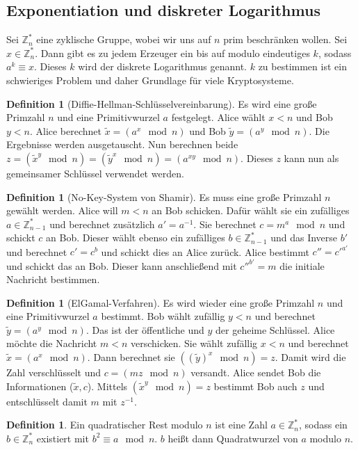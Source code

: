 \documentclass[a4paper, 12pt]{article}
\theoremstyle{plain}
\theoremstyle{definition}
\newtheorem{definition}[theorem]{Definition} %
\theoremstyle{lemma}
\theoremstyle{remark}
\theoremstyle{corollary}
\theoremstyle{example}
\begin{document}
	\subsection{Exponentiation und diskreter Logarithmus}
	Sei $\mathbb{Z}_n^*$ eine zyklische Gruppe, wobei wir uns auf $n$ prim beschränken wollen. Sei $x \in \mathbb{Z}_n^*$. Dann gibt es zu jedem Erzeuger ein bis auf modulo eindeutiges $k$, sodass $a^k \equiv x$. Dieses $k$ wird der diskrete Logarithmus genannt. $k$ zu bestimmen ist ein schwieriges Problem und daher Grundlage für viele Kryptosysteme.
	\begin{definition}[Diffie-Hellman-Schlüsselvereinbarung]
		Es wird eine große Primzahl $n$ und eine Primitivwurzel $a$ festgelegt. Alice wählt $x<n$ und Bob $y<n$. Alice berechnet $\tilde{x} = (a^x \mod n)$ und Bob $\tilde{y} = (a^y \mod n)$. Die Ergebnisse werden ausgetauscht. Nun berechnen beide $z = (\tilde{x}^y \mod n) = (\tilde{y}^x \mod n) = (a^{xy} \mod n)$. Dieses $z$ kann nun als gemeinsamer Schlüssel verwendet werden.
	\end{definition}
	\begin{definition}[No-Key-System von Shamir]
		Es muss eine große Primzahl $n$ gewählt werden. Alice will $m<n$ an Bob schicken. Dafür wählt sie ein zufälliges $a \in \mathbb{Z}_{n-1}^*$ und berechnet zusätzlich $a' = a^{-1}$. Sie berechnet $c = m^a \mod n$ und schickt $c$ an Bob. Dieser wählt ebenso ein zufälliges $b \in \mathbb{Z}_{n-1}^*$ und das Inverse $b'$ und berechnet $c' = c^b$ und schickt dies an Alice zurück. Alice bestimmt $c'' = c'^{a'}$ und schickt das an Bob. Dieser kann anschließend mit $c''^{b'} = m$ die initiale Nachricht bestimmen.
	\end{definition}
	\begin{definition}[ElGamal-Verfahren]
		Es wird wieder eine große Primzahl $n$ und eine Primitivwurzel $a$ bestimmt. Bob wählt zufällig $y < n$ und berechnet $\tilde{y} = (a^y \mod n)$. Das ist der öffentliche und $y$ der geheime Schlüssel. Alice möchte die Nachricht $m < n$ verschicken. Sie wählt zufällig $x<n$ und berechnet $\tilde{x} = (a^x \mod n)$. Dann berechnet sie $((\tilde{y})^x \mod n) = z$. Damit wird die Zahl verschlüsselt und $c = (mz \mod n)$ versandt. Alice sendet Bob die Informationen ($\tilde{x},c$). Mittels $(\tilde{x}^y \mod n) = z$ bestimmt Bob auch $z$ und entschlüsselt damit $m$ mit $z^{-1}$.
	\end{definition}
	\begin{definition}
		Ein quadratischer Rest modulo $n$ ist eine Zahl $a \in \mathbb{Z}_n^*$, sodass ein $b \in \mathbb{Z}_n^*$ existiert mit $b^2 \equiv a \mod n$. $b$ heißt dann Quadratwurzel von $a$ modulo $n$.
	\end{definition}
\end{document}
